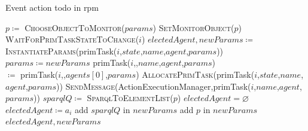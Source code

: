 \documentclass[a4paper,11pt,twoside]{StyleThese}
\begin{document}
\begin{algorithm}[!htb]
	\caption{Event action todo in \acrshort{rpm}}
	\label{chap2:algo:todo}
	\begin{algorithmic}
	\State $p \coloneqq$ \textsc{ChooseObjectToMonitor($params$)}
	\State \textsc{SetMonitorObject($p$)}
	\State \textsc{WaitForPrimTaskStateToChange($i$)}
		\State $electedAgent,newParams\coloneqq$
		\\\hfill \textsc{InstantiateParams}(primTask($i$,$state$,$name$,$agent$,$params$))
		\State $params \coloneqq newParams$
		\EndIf
			\State primTask($i$,,$name$,$agent$,$params$) 
			\\\hfill $\coloneqq$ primTask($i$,,$agents[0]$,$params$)
		\Else
			\State \textsc{AllocatePrimTask}(primTask($i$,$state$,$name$,$agent$,$params$))
			 \State \textsc{SendMessage}(ActionExecutionManager,primTask($i$,$name$,$agent$,$params$))
			 \EndIf
		\EndIf
	\EndIf
	\EndFunction
	\Statex
		\State $sparqlQ \coloneqq$ \textsc{SparqlToElementList($p$)} 
		\State $electedAgent = \varnothing$
			\State $electedAgent \coloneqq a_i$
		\EndIf
		\State add $sparqlQ$ in $newParams$
	\Else
		\State add $p$ in $newParams$
	\EndIf
	\EndFor
	\State \Return $electedAgent,newParams$
	\EndFunction
\end{algorithmic}
\end{algorithm}
\end{document}
